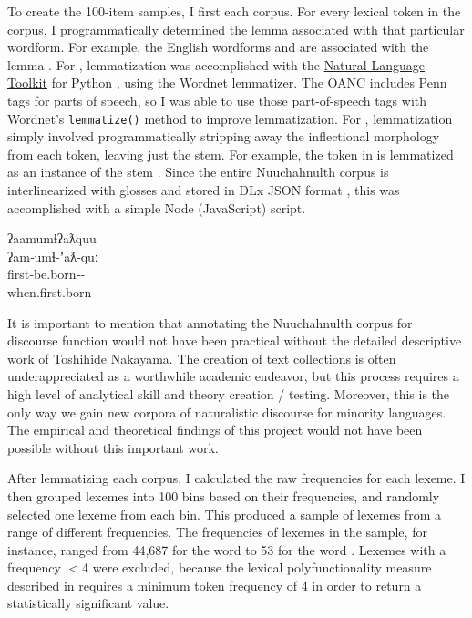 To create the 100-item samples, I first  each corpus. For every lexical token in the corpus, I programmatically determined the lemma associated with that particular wordform. For example, the English wordforms  and  are associated with the lemma . For , lemmatization was accomplished with the \href{http://www.nltk.org/}{Natural Language Toolkit} for Python \parencite{BirdKleinLoper2009}, using the Wordnet lemmatizer. The OANC includes Penn tags for parts of speech, so I was able to use those part-of-speech tags with Wordnet's \texttt{lemmatize()} method to improve lemmatization. For , lemmatization simply involved programmatically stripping away the inflectional morphology from each token, leaving just the stem. For example, the token in  is lemmatized as an instance of the stem  . Since the entire Nuuchahnulth corpus is interlinearized with glosses and stored in DLx JSON format \parencite{Hieber2021a}, this was accomplished with a simple Node (JavaScript) script.

\begin{exe}
  \ex\label{ex:3.1}
  \vfix
  \gllll ʔaamumɬʔaƛquu\\
         ʔam‑umɬ‑ʼaƛ‑quː\\
         first‑be.born‑‑\\
         when.first.born\\
         \vfix
\end{exe}

\noindent It is important to mention that annotating the Nuuchahnulth corpus for discourse function would not have been practical without the detailed descriptive work of Toshihide Nakayama. The creation of text collections is often underappreciated as a worthwhile academic endeavor, but this process requires a high level of analytical skill and theory creation / testing. Moreover, this is the only way we gain new corpora of naturalistic discourse for minority languages. The empirical and theoretical findings of this project would not have been possible without this important work.

After lemmatizing each corpus, I calculated the raw frequencies for each lexeme. I then grouped lexemes into 100 bins based on their frequencies, and randomly selected one lexeme from each bin. This produced a sample of lexemes from a range of different frequencies. The frequencies of lexemes in the  sample, for instance, ranged from 44,687 for the word  to 53 for the word . Lexemes with a frequency $<$4 were excluded, because the lexical polyfunctionality measure described in  requires a minimum token frequency of 4 in order to return a statistically significant value.

